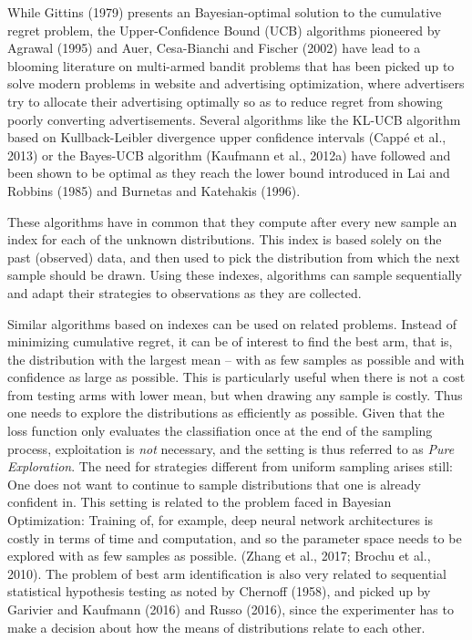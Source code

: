 \documentclass[11pt,]{article}
\begin{document}
While Gittins (1979) presents an Bayesian-optimal solution to the
cumulative regret problem, the Upper-Confidence Bound (UCB) algorithms
pioneered by Agrawal (1995) and Auer, Cesa-Bianchi and Fischer (2002)
have lead to a blooming literature on multi-armed bandit problems that
has been picked up to solve modern problems in website and advertising
optimization, where advertisers try to allocate their advertising
optimally so as to reduce regret from showing poorly converting
advertisements. Several algorithms like the KL-UCB algorithm based on
Kullback-Leibler divergence upper confidence intervals (Cappé et al.,
2013) or the Bayes-UCB algorithm (Kaufmann et al., 2012a) have followed
and been shown to be optimal as they reach the lower bound introduced in
Lai and Robbins (1985) and Burnetas and Katehakis (1996).

These algorithms have in common that they compute after every new sample
an index for each of the unknown distributions. This index is based
solely on the past (observed) data, and then used to pick the
distribution from which the next sample should be drawn. Using these
indexes, algorithms can sample sequentially and adapt their strategies
to observations as they are collected.

Similar algorithms based on indexes can be used on related problems.
Instead of minimizing cumulative regret, it can be of interest to find
the best arm, that is, the distribution with the largest mean -- with as
few samples as possible and with confidence as large as possible. This
is particularly useful when there is not a cost from testing arms with
lower mean, but when drawing any sample is costly. Thus one needs to
explore the distributions as efficiently as possible. Given that the
loss function only evaluates the classifiation once at the end of the
sampling process, exploitation is \emph{not} necessary, and the setting
is thus referred to as \emph{Pure Exploration}. The need for strategies
different from uniform sampling arises still: One does not want to
continue to sample distributions that one is already confident in. This
setting is related to the problem faced in Bayesian Optimization:
Training of, for example, deep neural network architectures is costly in
terms of time and computation, and so the parameter space needs to be
explored with as few samples as possible. (Zhang et al., 2017; Brochu et
al., 2010). The problem of best arm identification is also very related
to sequential statistical hypothesis testing as noted by Chernoff
(1958), and picked up by Garivier and Kaufmann (2016) and Russo (2016),
since the experimenter has to make a decision about how the means of
distributions relate to each other.
\end{document}
